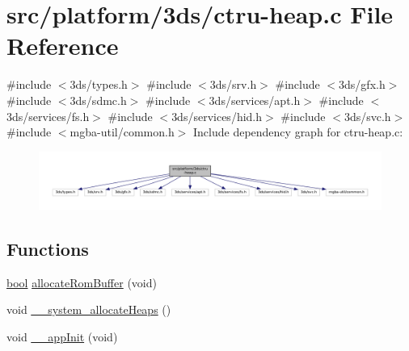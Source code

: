\hypertarget{ctru-heap_8c}{}\section{src/platform/3ds/ctru-\/heap.c File Reference}
\label{ctru-heap_8c}
{\ttfamily \#include $<$3ds/types.\+h$>$}\newline
{\ttfamily \#include $<$3ds/srv.\+h$>$}\newline
{\ttfamily \#include $<$3ds/gfx.\+h$>$}\newline
{\ttfamily \#include $<$3ds/sdmc.\+h$>$}\newline
{\ttfamily \#include $<$3ds/services/apt.\+h$>$}\newline
{\ttfamily \#include $<$3ds/services/fs.\+h$>$}\newline
{\ttfamily \#include $<$3ds/services/hid.\+h$>$}\newline
{\ttfamily \#include $<$3ds/svc.\+h$>$}\newline
{\ttfamily \#include $<$mgba-\/util/common.\+h$>$}\newline
Include dependency graph for ctru-\/heap.c\+:
\nopagebreak
\begin{figure}[H]
\begin{center}
\leavevmode
\includegraphics[width=350pt]{ctru-heap_8c__incl}
\end{center}
\end{figure}
\subsection*{Functions}
\begin{DoxyCompactItemize}
\item 
\mbox{\hyperlink{libretro_8h_a4a26dcae73fb7e1528214a068aca317e}{bool}} \mbox{\hyperlink{ctru-heap_8c_a0bd24a0db1208055a4b6ab4f7c2c3aa8}{allocate\+Rom\+Buffer}} (void)
\item 
void \mbox{\hyperlink{ctru-heap_8c_ac8e83c882d54db69f0d13b4cf0d42a8c}{\+\_\+\+\_\+system\+\_\+allocate\+Heaps}} ()
\item 
void \mbox{\hyperlink{ctru-heap_8c_a014ed46e4e8f30997f14a0cf77e145a3}{\+\_\+\+\_\+app\+Init}} (void)
\end{DoxyCompactItemize}
